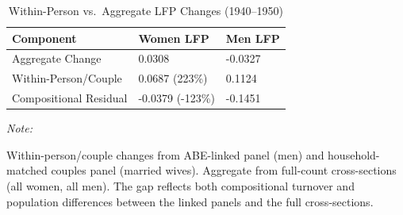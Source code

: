\begin{table}
\centering
\caption{\label{tab:decomposition}Within-Person vs.\ Aggregate LFP Changes (1940--1950)}
\centering
\begin{threeparttable}
\begin{tabular}[t]{lll}
\toprule
Component & Women LFP & Men LFP\\
\midrule
Aggregate Change & 0.0308 & -0.0327\\
Within-Person/Couple & 0.0687 (223\%) & 0.1124\\
Compositional Residual & -0.0379 (-123\%) & -0.1451\\
\bottomrule
\end{tabular}
\begin{tablenotes}
\item \textit{Note: } 
\item Within-person/couple changes from ABE-linked panel (men) and household-matched couples panel (married wives). Aggregate from full-count cross-sections (all women, all men). The gap reflects both compositional turnover and population differences between the linked panels and the full cross-sections.
\end{tablenotes}
\end{threeparttable}
\end{table}
